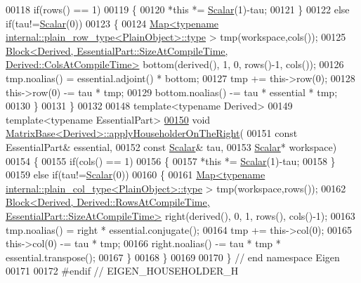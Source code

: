 \begin{DoxyCode}
00118   \textcolor{keywordflow}{if}(rows() == 1)
00119   \{
00120     *\textcolor{keyword}{this} *= \hyperlink{group___core___module_a5feed465b3a8e60c47e73ecce83e39a2}{Scalar}(1)-tau;
00121   \}
00122   \textcolor{keywordflow}{else} \textcolor{keywordflow}{if}(tau!=\hyperlink{group___core___module_a5feed465b3a8e60c47e73ecce83e39a2}{Scalar}(0))
00123   \{
00124     \hyperlink{group___core___module_class_eigen_1_1_map}{Map<typename internal::plain\_row\_type<PlainObject>::type}
      > tmp(workspace,cols());
00125     \hyperlink{group___core___module_class_eigen_1_1_block}{Block<Derived, EssentialPart::SizeAtCompileTime, Derived::ColsAtCompileTime>}
       bottom(derived(), 1, 0, rows()-1, cols());
00126     tmp.noalias() = essential.adjoint() * bottom;
00127     tmp += this->row(0);
00128     this->row(0) -= tau * tmp;
00129     bottom.noalias() -= tau * essential * tmp;
00130   \}
00131 \}
00132 
00148 \textcolor{keyword}{template}<\textcolor{keyword}{typename} Derived>
00149 \textcolor{keyword}{template}<\textcolor{keyword}{typename} EssentialPart>
\hyperlink{group___core___module_ab3e52262b41fa40e194dda245e0f9675}{00150} \textcolor{keywordtype}{void} \hyperlink{group___core___module_ab3e52262b41fa40e194dda245e0f9675}{MatrixBase<Derived>::applyHouseholderOnTheRight}(
00151   \textcolor{keyword}{const} EssentialPart& essential,
00152   \textcolor{keyword}{const} \hyperlink{group___core___module_a5feed465b3a8e60c47e73ecce83e39a2}{Scalar}& tau,
00153   \hyperlink{group___core___module_a5feed465b3a8e60c47e73ecce83e39a2}{Scalar}* workspace)
00154 \{
00155   \textcolor{keywordflow}{if}(cols() == 1)
00156   \{
00157     *\textcolor{keyword}{this} *= \hyperlink{group___core___module_a5feed465b3a8e60c47e73ecce83e39a2}{Scalar}(1)-tau;
00158   \}
00159   \textcolor{keywordflow}{else} \textcolor{keywordflow}{if}(tau!=\hyperlink{group___core___module_a5feed465b3a8e60c47e73ecce83e39a2}{Scalar}(0))
00160   \{
00161     \hyperlink{group___core___module_class_eigen_1_1_map}{Map<typename internal::plain\_col\_type<PlainObject>::type}
      > tmp(workspace,rows());
00162     \hyperlink{group___core___module_class_eigen_1_1_block}{Block<Derived, Derived::RowsAtCompileTime, EssentialPart::SizeAtCompileTime>}
       right(derived(), 0, 1, rows(), cols()-1);
00163     tmp.noalias() = right * essential.conjugate();
00164     tmp += this->col(0);
00165     this->col(0) -= tau * tmp;
00166     right.noalias() -= tau * tmp * essential.transpose();
00167   \}
00168 \}
00169 
00170 \} \textcolor{comment}{// end namespace Eigen}
00171 
00172 \textcolor{preprocessor}{#endif // EIGEN\_HOUSEHOLDER\_H}
\end{DoxyCode}
